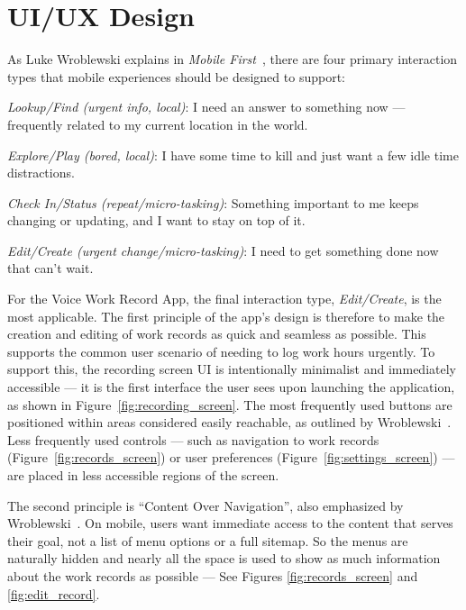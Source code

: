 \documentclass[
  digital,     %
  oneside,     %
  nosansbold,  %
  nocolorbold, %
  lof,         %
  lot,         %
]{fithesis4}
\begin{document}
\newpage
\section{UI/UX Design}
\label{chap:ui_design}

As Luke Wroblewski explains in \textit{Mobile First}~\cite[p.~50]{wroblewski2011mobile}, there are four primary interaction types that mobile experiences should be designed to support:

\begin{compactitem}
  \item \textit{Lookup/Find (urgent info, local)}: I need an answer to something now --- frequently related to my current location in the world.
  \item \textit{Explore/Play (bored, local)}: I have some time to kill and just want a few idle time distractions.
  \item \textit{Check In/Status (repeat/micro-tasking)}: Something important to me keeps changing or updating, and I want to stay on top of it.
  \item \textit{Edit/Create (urgent change/micro-tasking)}: I need to get something done now that can’t wait.
\end{compactitem}

\vspace{\baselineskip}

For the Voice Work Record App, the final interaction type, \textit{Edit/Create}, is the most applicable. The first principle of the app’s design is therefore to make the creation and editing of work records as quick and seamless as possible. This supports the common user scenario of needing to log work hours urgently. To support this, the recording screen \gls{UI} is intentionally minimalist and immediately accessible --- it is the first interface the user sees upon launching the application, as shown in Figure~\ref{fig:recording_screen}. The most frequently used buttons are positioned within areas considered easily reachable, as outlined by Wroblewski~\cite[p.~73]{wroblewski2011mobile}. Less frequently used controls --- such as navigation to work records (Figure~\ref{fig:records_screen}) or user preferences (Figure~\ref{fig:settings_screen}) --- are placed in less accessible regions of the screen.

The second principle is ``Content Over Navigation'', also emphasized by Wroblewski~\cite[p.~52]{wroblewski2011mobile}. On mobile, users want immediate access to the content that serves their goal, not a list of menu options or a full sitemap. So the menus are naturally hidden and nearly all the space is used to show as much information about the work records as possible --- See Figures \ref{fig:records_screen} and \ref{fig:edit_record}.
\end{document}
